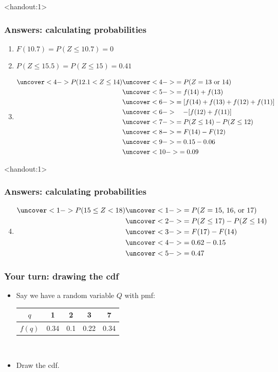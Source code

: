 \documentclass[handout]{beamer}\usepackage[]{graphicx}\usepackage[]{color}
\newcommand{\answers}{1}
\providecommand{\q}{$\quad$ \newline}
\numberwithin{equation}{section}
\begin{document}
\begin{frame}<handout:\answers>
\frametitle{Answers: calculating probabilities}
\begin{enumerate}[1. ]
\pause \item $F(10.7) = P(Z \le 10.7) = 0$
\pause \item $P(Z \le 15.5) = P(Z \le 15)  = 0.41$
\pause \item \begin{align*}
\uncover<4->{P( 12.1 < Z \le 14)} & \uncover<4->{= P(Z = \text{13 or 14})} \\
& \uncover<5->{ = f(14) + f(13)} \\
& \uncover<6->{ = [f(14) + f(13) + f(12) + f(11)] } \\
& \uncover<6->{\quad - [f(12) + f(11)]} \\
& \uncover<7->{= P(Z \le 14) - P(Z \le 12)} \\
& \uncover<8->{ = F(14) - F(12)} \\
& \uncover<9->{= 0.15 - 0.06} \\
& \uncover<10->{= 0.09}
\end{align*}
\end{enumerate}
\end{frame}

\begin{frame}<handout:\answers>
\frametitle{Answers: calculating probabilities}
\begin{enumerate}
\setcounter{enumi}{3}
\item 
\begin{align*}
\uncover<1->{P(15 \le Z <  18)} & \uncover<1->{= P(Z = \text{15, 16, or 17})} \\
& \uncover<2->{= P(Z \le 17) - P(Z \le 14)} \\
& \uncover<3->{= F(17) - F(14)} \\
& \uncover<4->{= 0.62 - 0.15} \\
& \uncover<5->{= 0.47}
\end{align*}
\end{enumerate}
\end{frame}


\begin{frame}
\frametitle{Your turn: drawing the cdf}

\begin{itemize}
\item Say we have a random variable $Q$ with pmf: \q \q
\begin{tabular}{ccccc}
$q$ & 1 & 2 & 3 & 7  \\ \hline
$f(q)$ & 0.34 & 0.1 & 0.22 & 0.34\\
\end{tabular} \q
\item Draw the cdf.
\end{itemize}
\end{frame}
\end{document}
